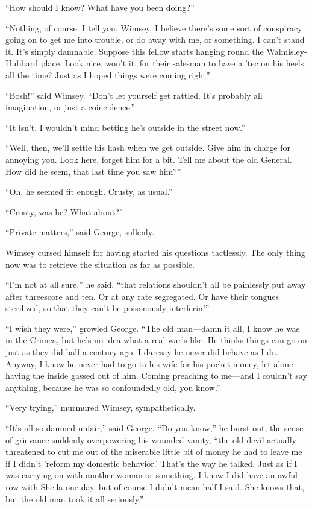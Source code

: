 \enquote{How should I know? What have you been doing?}

\enquote{Nothing, of course. I tell you, Wimsey, I believe there's some sort of conspiracy going on to get me into trouble, or do away with me, or something. I can't stand it. It's simply damnable. Suppose this fellow starts hanging round the Walmisley-Hubbard place. Look nice, won't it, for their salesman to have a 'tec on his heels all the time? Just as I hoped things were coming right\longdash}

\enquote{Bosh!} said Wimsey. \enquote{Don't let yourself get rattled. It's probably all imagination, or just a coincidence.}

\enquote{It isn't. I wouldn't mind betting he's outside in the street now.}

\enquote{Well, then, we'll settle his hash when we get outside. Give him in charge for annoying you. Look here, forget him for a bit. Tell me about the old General. How did he seem, that last time you saw him?}

\enquote{Oh, he seemed fit enough. Crusty, as usual.}

\enquote{Crusty, was he? What about?}

\enquote{Private matters,} said George, sullenly.

Wimsey cursed himself for having started his questions tactlessly. The only thing now was to retrieve the situation as far as possible.

\enquote{I'm not at all sure,} he said, \enquote{that relations shouldn't all be painlessly put away after threescore and ten. Or at any rate segregated. Or have their tongues sterilized, so that they can't be poisonously interferin'.}

\enquote{I wish they were,} growled George. \enquote{The old man\allowbreak---\allowbreak damn it all, I know he was in the Crimea, but he's no idea what a real war's like. He thinks things can go on just as they did half a century ago. I daresay he never did behave as I do. Anyway, I know he never had to go to his wife for his pocket-money, let alone having the inside gassed out of him. Coming preaching to me\allowbreak---\allowbreak and I couldn't say anything, because he was so confoundedly old, you know.}

\enquote{Very trying,} murmured Wimsey, sympathetically.

\enquote{It's all so damned unfair,} said George. \enquote{Do you know,} he burst out, the sense of grievance suddenly overpowering his wounded vanity, \enquote{the old devil actually threatened to cut me out of the miserable little bit of money he had to leave me if I didn't 'reform my domestic behavior.' That's the way he talked. Just as if I was carrying on with another woman or something. I know I did have an awful row with Sheila one day, but of course I didn't mean half I said. She knows that, but the old man took it all seriously.}

